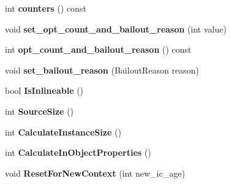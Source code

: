 \begin{DoxyCompactItemize}
\item 
\hypertarget{classv8_1_1internal_1_1_shared_function_info_a40be83281a87b2753bb4e7653b1752ad}{}int {\bfseries counters} () const \label{classv8_1_1internal_1_1_shared_function_info_a40be83281a87b2753bb4e7653b1752ad}

\item 
\hypertarget{classv8_1_1internal_1_1_shared_function_info_ab161c64dd00bdd9b16af06b52bf35b1a}{}void {\bfseries set\+\_\+opt\+\_\+count\+\_\+and\+\_\+bailout\+\_\+reason} (int value)\label{classv8_1_1internal_1_1_shared_function_info_ab161c64dd00bdd9b16af06b52bf35b1a}

\item 
\hypertarget{classv8_1_1internal_1_1_shared_function_info_ac056efeabe472b9f110026311ffb08d8}{}int {\bfseries opt\+\_\+count\+\_\+and\+\_\+bailout\+\_\+reason} () const \label{classv8_1_1internal_1_1_shared_function_info_ac056efeabe472b9f110026311ffb08d8}

\item 
\hypertarget{classv8_1_1internal_1_1_shared_function_info_a885885dafd45fe2a85285e485f2e8347}{}void {\bfseries set\+\_\+bailout\+\_\+reason} (Bailout\+Reason reason)\label{classv8_1_1internal_1_1_shared_function_info_a885885dafd45fe2a85285e485f2e8347}

\item 
\hypertarget{classv8_1_1internal_1_1_shared_function_info_aab93be19f41a3a1c3cc52c0ef0590794}{}bool {\bfseries Is\+Inlineable} ()\label{classv8_1_1internal_1_1_shared_function_info_aab93be19f41a3a1c3cc52c0ef0590794}

\item 
\hypertarget{classv8_1_1internal_1_1_shared_function_info_a6e3ea25186cfb597d5ef46ff6e9ffab9}{}int {\bfseries Source\+Size} ()\label{classv8_1_1internal_1_1_shared_function_info_a6e3ea25186cfb597d5ef46ff6e9ffab9}

\item 
\hypertarget{classv8_1_1internal_1_1_shared_function_info_aeed3300d9d186e1341f02ceaee738f14}{}int {\bfseries Calculate\+Instance\+Size} ()\label{classv8_1_1internal_1_1_shared_function_info_aeed3300d9d186e1341f02ceaee738f14}

\item 
\hypertarget{classv8_1_1internal_1_1_shared_function_info_ae4ee1faf489b900180a0f88e899de22e}{}int {\bfseries Calculate\+In\+Object\+Properties} ()\label{classv8_1_1internal_1_1_shared_function_info_ae4ee1faf489b900180a0f88e899de22e}

\item 
\hypertarget{classv8_1_1internal_1_1_shared_function_info_a27dc03d3247ee74eb9474733f73de667}{}void {\bfseries Reset\+For\+New\+Context} (int new\+\_\+ic\+\_\+age)\label{classv8_1_1internal_1_1_shared_function_info_a27dc03d3247ee74eb9474733f73de667}

\end{DoxyCompactItemize}
